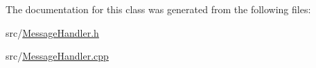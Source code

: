 The documentation for this class was generated from the following files\+:\begin{DoxyCompactItemize}
\item 
src/\hyperlink{_message_handler_8h}{Message\+Handler.\+h}\item 
src/\hyperlink{_message_handler_8cpp}{Message\+Handler.\+cpp}\end{DoxyCompactItemize}
